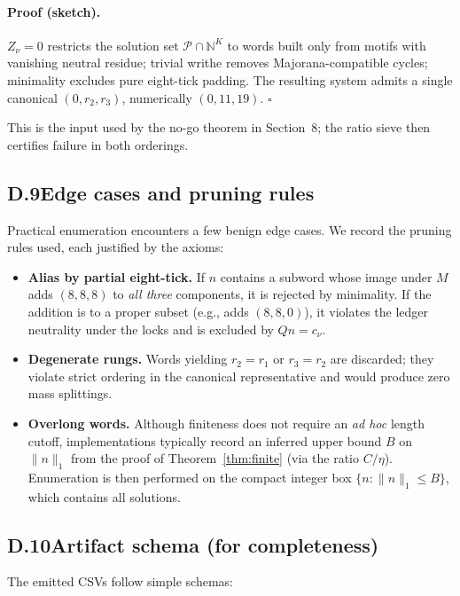 \documentclass[11pt]{article}
\begin{document}
\paragraph{Proof (sketch).}
$Z_\nu=0$ restricts the solution set $\mathcal{P}\cap\mathbb{N}^K$ to words built only from motifs with vanishing neutral residue; trivial writhe removes Majorana-compatible cycles; minimality excludes pure eight-tick padding. The resulting system admits a single canonical $(0,r_2,r_3)$, numerically $(0,11,19)$. \hfill$\square$

This is the input used by the no-go theorem in Section~8; the ratio sieve then certifies failure in both orderings.

\subsection*{D.9\quad Edge cases and pruning rules}

Practical enumeration encounters a few benign edge cases. We record the pruning rules used, each justified by the axioms:

\begin{itemize}
  \item \textbf{Alias by partial eight-tick.} If $n$ contains a subword whose image under $M$ adds $(8,8,8)$ to \emph{all three} components, it is rejected by minimality. If the addition is to a proper subset (e.g., adds $(8,8,0)$), it violates the ledger neutrality under the locks and is excluded by $Qn=c_\nu$.
  \item \textbf{Degenerate rungs.} Words yielding $r_2=r_1$ or $r_3=r_2$ are discarded; they violate strict ordering in the canonical representative and would produce zero mass splittings.
  \item \textbf{Overlong words.} Although finiteness does not require an \emph{ad hoc} length cutoff, implementations typically record an inferred upper bound $B$ on $\|n\|_1$ from the proof of Theorem~\ref{thm:finite} (via the ratio $C/\eta$). Enumeration is then performed on the compact integer box $\{n:\|n\|_1\le B\}$, which contains all solutions.
\end{itemize}

\subsection*{D.10\quad Artifact schema (for completeness)}

The emitted CSVs follow simple schemas:
\end{document}

